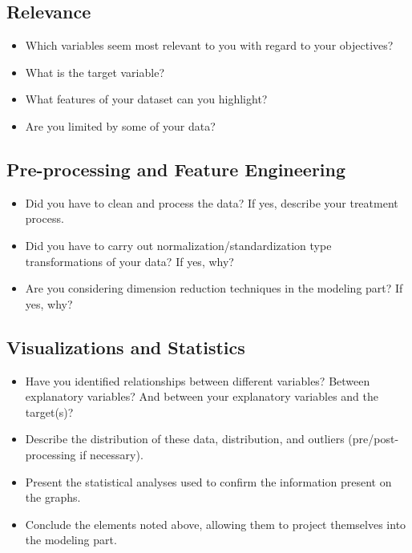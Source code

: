 \subsection*{Relevance}
\begin{itemize}[label=\textbullet]
    \item Which variables seem most relevant to you with regard to your objectives?
    \item What is the target variable?
    \item What features of your dataset can you highlight?
    \item Are you limited by some of your data?
\end{itemize}

\subsection*{Pre-processing and Feature Engineering}
\begin{itemize}[label=\textbullet]
    \item Did you have to clean and process the data? If yes, describe your treatment process.
    \item Did you have to carry out normalization/standardization type transformations of your data? If yes, why?
    \item Are you considering dimension reduction techniques in the modeling part? If yes, why?
\end{itemize}

\subsection*{Visualizations and Statistics}
\begin{itemize}[label=\textbullet]
    \item Have you identified relationships between different variables? Between explanatory variables? And between your explanatory variables and the target(s)?
    \item Describe the distribution of these data, distribution, and outliers (pre/post-processing if necessary).
    \item Present the statistical analyses used to confirm the information present on the graphs.
    \item Conclude the elements noted above, allowing them to project themselves into the modeling part.
\end{itemize}
